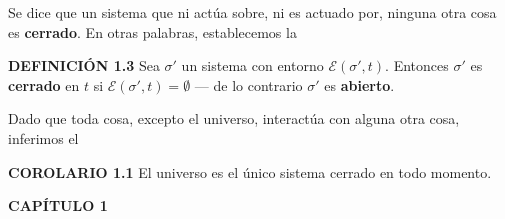 {Se dice que un sistema que ni actúa sobre, ni es actuado por, ninguna otra cosa es \textbf{cerrado}. En otras palabras, establecemos la

\textbf{DEFINICIÓN 1.3} Sea $\sigma'$ un sistema con entorno $\mathcal{E}(\sigma', t)$. Entonces $\sigma'$ es \textbf{cerrado} en $t$ si $\mathcal{E}(\sigma', t) = \emptyset$ — de lo contrario $\sigma'$ es \textbf{abierto}.

Dado que toda cosa, excepto el universo, interactúa con alguna otra cosa, inferimos el

\textbf{COROLARIO 1.1} El universo es el único sistema cerrado en todo momento.
}

\newpage

\fancyhf{}
\fancyhead[l]{\thepage} 
\begin{center}
{\fontsize{13}{16}\selectfont \textbf{CAPÍTULO 1 }}
\end{center}
\vspace{0.5cm}


